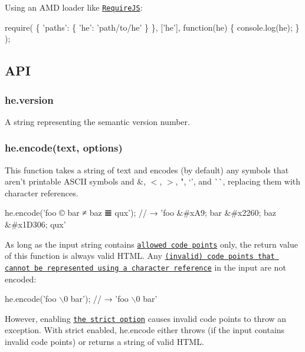 Using an A\+MD loader like \href{http://requirejs.org/}{\tt Require\+JS}\+:


\begin{DoxyCode}
require(
  \{
    'paths': \{
      'he': 'path/to/he'
    \}
  \},
  ['he'],
  function(he) \{
    console.log(he);
  \}
);
\end{DoxyCode}


\subsection*{A\+PI}

\subsubsection*{{\ttfamily he.\+version}}

A string representing the semantic version number.

\subsubsection*{{\ttfamily he.\+encode(text, options)}}

This function takes a string of text and encodes (by default) any symbols that aren’t printable A\+S\+C\+II symbols and {\ttfamily \&}, {\ttfamily $<$}, {\ttfamily $>$}, {\ttfamily "}, `'{\ttfamily , and} \`{}\`{}, replacing them with character references.


\begin{DoxyCode}
he.encode('foo © bar ≠ baz 𝌆 qux');
// → 'foo &#xA9; bar &#x2260; baz &#x1D306; qux'
\end{DoxyCode}


As long as the input string contains \href{https://html.spec.whatwg.org/multipage/parsing.html#preprocessing-the-input-stream}{\tt allowed code points} only, the return value of this function is always valid H\+T\+ML. Any \href{https://html.spec.whatwg.org/multipage/syntax.html#table-charref-overrides}{\tt (invalid) code points that cannot be represented using a character reference} in the input are not encoded\+:


\begin{DoxyCode}
he.encode('foo \(\backslash\)0 bar');
// → 'foo \(\backslash\)0 bar'
\end{DoxyCode}


However, enabling \href{https://github.com/mathiasbynens/he#strict}{\tt the {\ttfamily strict} option} causes invalid code points to throw an exception. With {\ttfamily strict} enabled, {\ttfamily he.\+encode} either throws (if the input contains invalid code points) or returns a string of valid H\+T\+ML.

